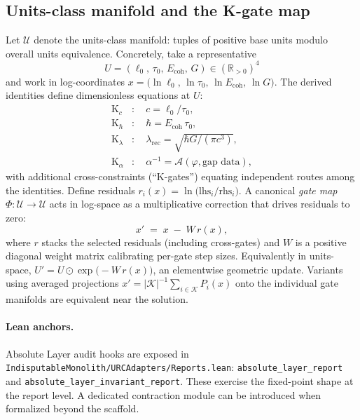\documentclass[11pt]{article}
\begin{document}
\subsection{Units\mbox{-}class manifold and the K\mbox{-}gate map}
Let \(\mathcal{U}\) denote the units\mbox{-}class manifold: tuples of positive base units modulo overall units equivalence. Concretely, take a representative
\[
  U=(\ell_0,\, \tau_0,\, E_{\mathrm{coh}},\, G)\in (\mathbb{R}_{>0})^4
\]
and work in log\mbox{-}coordinates \(x=\bigl(\ln \ell_0,\, \ln \tau_0,\, \ln E_{\mathrm{coh}},\, \ln G\bigr)\). The derived identities define dimensionless equations at \(U\):
\begin{align*}
  \mathrm{K}_c&:\quad c=\ell_0/\tau_0,\\
  \mathrm{K}_{\hbar}&:\quad \hbar=E_{\mathrm{coh}}\,\tau_0,\\
  \mathrm{K}_{\lambda}&:\quad \lambda_{\mathrm{rec}}=\sqrt{\hbar G/(\pi c^3)},\\
  \mathrm{K}_{\alpha}&:\quad \alpha^{-1}=\mathcal{A}(\varphi,\text{gap data}),
\end{align*}
with additional cross\mbox{-}constraints (``K\mbox{-}gates'') equating independent routes among the identities. Define residuals \(r_i(x)=\ln\bigl(\mathrm{lhs}_i/\mathrm{rhs}_i\bigr)\). A canonical \emph{gate map} \(\Phi\colon \mathcal{U}\to\mathcal{U}\) acts in log\mbox{-}space as a multiplicative correction that drives residuals to zero:
\[
  x'\;=\;x\; -\; W\, r(x),
\]
where \(r\) stacks the selected residuals (including cross\mbox{-}gates) and \(W\) is a positive diagonal weight matrix calibrating per\mbox{-}gate step sizes. Equivalently in units\mbox{-}space, \(U' = U\odot \exp\bigl(-W\, r(x)\bigr)\), an elementwise geometric update. Variants using averaged projections \(x' = |\mathcal{K}|^{-1}\sum_{i\in\mathcal{K}} P_i(x)\) onto the individual gate manifolds are equivalent near the solution.

\paragraph{Lean anchors.} Absolute Layer audit hooks are exposed in \texttt{IndisputableMonolith/URCAdapters/Reports.lean}: \texttt{absolute\_layer\_report} and \texttt{absolute\_layer\_invariant\_report}. These exercise the fixed\mbox{-}point shape at the report level. A dedicated contraction module can be introduced when formalized beyond the scaffold.
\end{document}
